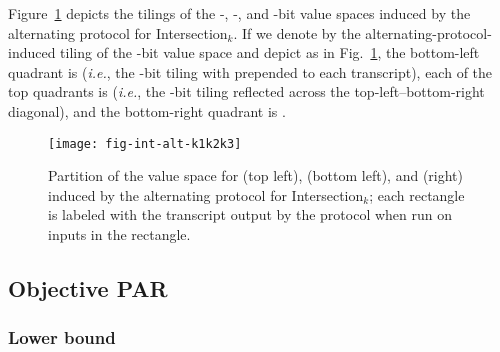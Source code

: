 \documentclass{article}
\theoremstyle{theorem}
\theoremstyle{definition}
\theoremstyle{remark}
\newcommand{\ie}{\emph{i.e.}}
\newcommand{\intersection}{{\sc In\-ter\-sec\-tion}\ensuremath{_k}}
\begin{document}
Figure~\ref{fig:int-alt-k1k2k3} depicts the tilings of the -, -, and -bit value spaces induced by the alternating protocol for \intersection.  If we denote by  the alternating-protocol-induced tiling of the -bit value space and depict  as in Fig.~\ref{fig:int-alt-k1k2k3}, the bottom-left quadrant is  (\ie, the -bit tiling with  prepended to each transcript), each of the top quadrants is  (\ie, the -bit tiling reflected across the top-left--bottom-right diagonal), and the bottom-right quadrant is .
\begin{figure}[htp]
\begin{center}
\texttt{[image: fig-int-alt-k1k2k3]}
\caption{Partition of the value space for  (top left),  (bottom left), and  (right) induced by the alternating protocol for \intersection; each rectangle is labeled with the transcript output by the protocol when run on inputs in the rectangle.}\label{fig:int-alt-k1k2k3}
\end{center}
\end{figure}


\subsection{Objective PAR}

\subsubsection{Lower bound}
\end{document}
